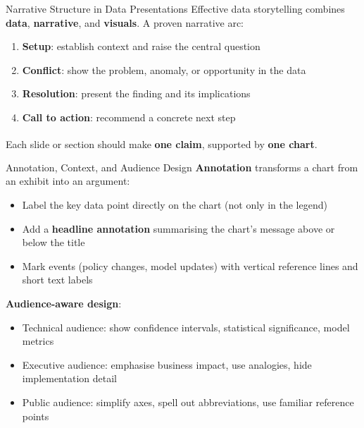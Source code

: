 \begin{v3topic}{Narrative Structure in Data Presentations}
    Effective data storytelling combines \textbf{data}, \textbf{narrative}, and
    \textbf{visuals}. A proven narrative arc:
    \begin{enumerate}
        \item \textbf{Setup}: establish context and raise the central question
        \item \textbf{Conflict}: show the problem, anomaly, or opportunity in the data
        \item \textbf{Resolution}: present the finding and its implications
        \item \textbf{Call to action}: recommend a concrete next step
    \end{enumerate}
    Each slide or section should make \textbf{one claim}, supported by \textbf{one
    chart}\textsuperscript{\cite[][pp.~25--60]{loducaDataStorytellingAltair2024}}.

\end{v3topic}
\begin{v3topic}{Annotation, Context, and Audience Design}
    \textbf{Annotation} transforms a chart from an exhibit into an argument:
    \begin{itemize}
        \item Label the key data point directly on the chart (not only in the legend)
        \item Add a \textbf{headline annotation} summarising the chart's message above
              or below the title
        \item Mark events (policy changes, model updates) with vertical reference lines
              and short text labels
    \end{itemize}
    \textbf{Audience-aware design}:
    \begin{itemize}
        \item Technical audience: show confidence intervals, statistical significance,
              model metrics
        \item Executive audience: emphasise business impact, use analogies, hide
              implementation detail
        \item Public audience: simplify axes, spell out abbreviations, use familiar
              reference points
    \end{itemize}
\end{v3topic}

